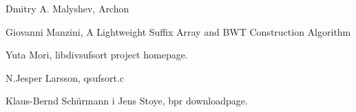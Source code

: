 {\begin{enumerate}[{[}A{]}]
			\item \label{archon} Dmitry A. Malyshev, Archon \\

			\item \label{MFcode} Giovanni Manzini, A Lightweight Suffix Array and BWT Construction Algorithm \\

			\item \label{libdivsufsort} Yuta Mori, libdivsufsort project homepage. \\


			\item \label{LScode} N.Jesper Larsson, qsufsort.c \\

\item \label{bpr-code}  Klaus-Bernd Sch\"{u}rmann i Jens Stoye, bpr downloadpage. \\



\end{enumerate}
}
